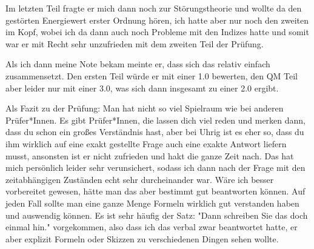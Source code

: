 Im letzten Teil fragte er mich dann noch zur Störungstheorie und wollte da den gestörten Energiewert erster Ordnung hören, ich hatte aber nur noch den zweiten im Kopf, wobei ich da dann auch noch Probleme mit den Indizes hatte und somit war er mit Recht sehr unzufrieden mit dem zweiten Teil der Prüfung.

Als ich dann meine Note bekam meinte er, dass sich das relativ einfach zusammensetzt. Den ersten Teil würde er mit einer 1.0 bewerten, den QM Teil aber leider nur mit einer 3.0, was sich dann insgesamt zu einer 2.0 ergibt. 

Als Fazit zu der Prüfung: Man hat nicht so viel Spielraum wie bei anderen Prüfer*Innen. Es gibt Prüfer*Innen, die lassen dich viel reden und merken dann, dass du schon ein großes Verständnis hast, aber bei Uhrig ist es eher so, dass du ihm wirklich auf eine exakt gestellte Frage auch eine exakte Antwort liefern musst, ansonsten ist er nicht zufrieden und hakt die ganze Zeit nach. Das hat mich persönlich leider sehr verunsichert, sodass ich dann nach der Frage mit den zeitabhängigen Zuständen echt sehr durcheinander war. Wäre ich besser vorbereitet gewesen, hätte man das aber bestimmt gut beantworten können.
Auf jeden Fall sollte man eine ganze Menge Formeln wirklich gut verstanden haben und auswendig können. Es ist sehr häufig der Satz: "Dann schreiben Sie das doch einmal hin." vorgekommen, also dass ich das verbal zwar beantwortet hatte, er aber explizit Formeln oder Skizzen zu verschiedenen Dingen sehen wollte. 
 
